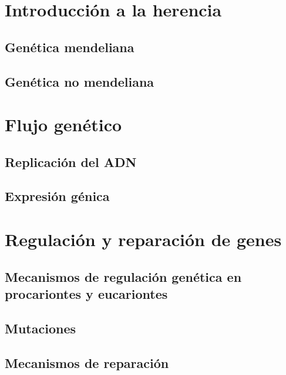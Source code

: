 \documentclass{../summarie}
\begin{document}
\frontmatter

    \NuevaPortada
    \tableofcontents
    \listoffigures
    \listoftables

\mainmatter
    
    \onehalfspacing


\part{Introducción a la herencia}

    \chapter{Genética mendeliana} 
    \chapter{Genética no mendeliana} 

\part{Flujo genético}

    \chapter{Replicación del ADN} 
    \chapter{Expresión génica} 

\part{Regulación y reparación de genes}

    \chapter{Mecanismos de regulación genética en procariontes y eucariontes} 
    \chapter{Mutaciones} 
    \chapter{Mecanismos de reparación} 
\end{document}
